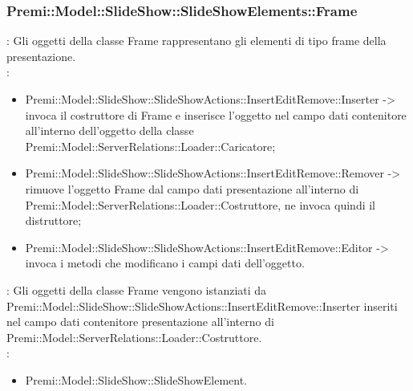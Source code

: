 {           \subsubsection{Premi::Model::SlideShow::SlideShowElements::Frame}{
				\textbf{\tipo}: Gli oggetti della classe Frame rappresentano gli elementi di tipo frame della presentazione.\\
				\textbf{\relaz}: 
				\begin{itemize}
					\item Premi::Model::SlideShow::SlideShowActions::InsertEditRemove::Inserter -> invoca il costruttore di Frame e inserisce l’oggetto nel campo dati contenitore all’interno dell’oggetto della classe Premi::Model::ServerRelations::Loader::Caricatore;
                    \item Premi::Model::SlideShow::SlideShowActions::InsertEditRemove::Remover -> rimuove l’oggetto Frame dal campo dati presentazione all’interno di Premi::Model::ServerRelations::Loader::Costruttore, ne invoca quindi il distruttore;
                    \item Premi::Model::SlideShow::SlideShowActions::InsertEditRemove::Editor -> invoca i metodi che modificano i campi dati dell'oggetto.
				\end{itemize}	
                \textbf{\interfacce}: Gli oggetti della classe Frame vengono istanziati da Premi::Model::SlideShow::SlideShowActions::InsertEditRemove::Inserter inseriti nel campo dati contenitore presentazione all’interno di Premi::Model::ServerRelations::Loader::Costruttore.\\
                \textbf{\base}: 
                    \begin{itemize}
                    \item Premi::Model::SlideShow::SlideShowElement.
                    \end{itemize}
                    }
}
